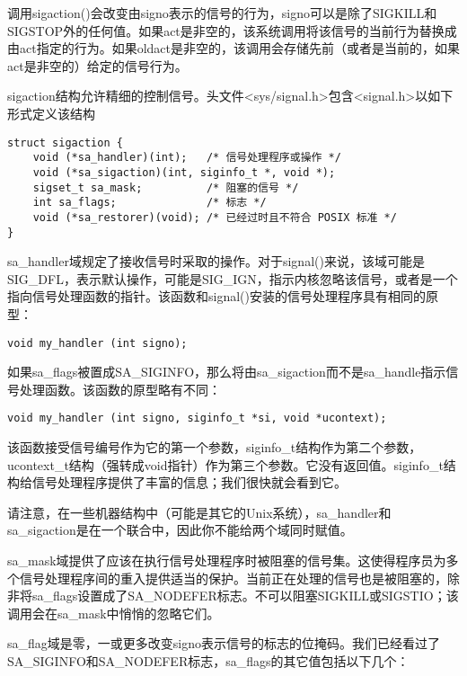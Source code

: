 调用sigaction()会改变由signo表示的信号的行为，signo可以是除了SIGKILL和SIGSTOP外的任何值。如果act是非空的，该系统调用将该信号的当前行为替换成由act指定的行为。如果oldact是非空的，该调用会存储先前（或者是当前的，如果act是非空的）给定的信号行为。

sigaction结构允许精细的控制信号。头文件<sys/signal.h>包含<signal.h>以如下形式定义该结构

\begin{lstlisting}
struct sigaction {
    void (*sa_handler)(int);   /* 信号处理程序或操作 */
    void (*sa_sigaction)(int, siginfo_t *, void *);
    sigset_t sa_mask;          /* 阻塞的信号 */
    int sa_flags;              /* 标志 */
    void (*sa_restorer)(void); /* 已经过时且不符合 POSIX 标准 */
}
\end{lstlisting}

sa\_handler域规定了接收信号时采取的操作。对于signal()来说，该域可能是SIG\_DFL，表示默认操作，可能是SIG\_IGN，指示内核忽略该信号，或者是一个指向信号处理函数的指针。该函数和signal()安装的信号处理程序具有相同的原型：

\begin{lstlisting}
void my_handler (int signo);
\end{lstlisting}

如果sa\_flags被置成SA\_SIGINFO，那么将由sa\_sigaction而不是sa\_handle指示信号处理函数。该函数的原型略有不同：

\begin{lstlisting}
void my_handler (int signo, siginfo_t *si, void *ucontext);
\end{lstlisting}

该函数接受信号编号作为它的第一个参数，siginfo\_t结构作为第二个参数，ucontext\_t结构（强转成void指针）作为第三个参数。它没有返回值。siginfo\_t结构给信号处理程序提供了丰富的信息；我们很快就会看到它。

请注意，在一些机器结构中（可能是其它的Unix系统），sa\_handler和sa\_sigaction是在一个联合中，因此你不能给两个域同时赋值。

sa\_mask域提供了应该在执行信号处理程序时被阻塞的信号集。这使得程序员为多个信号处理程序间的重入提供适当的保护。当前正在处理的信号也是被阻塞的，除非将sa\_flags设置成了SA\_NODEFER标志。不可以阻塞SIGKILL或SIGSTIO；该调用会在sa\_mask中悄悄的忽略它们。

sa\_flag域是零，一或更多改变signo表示信号的标志的位掩码。我们已经看过了SA\_SIGINFO和SA\_NODEFER标志，sa\_flags的其它值包括以下几个：

